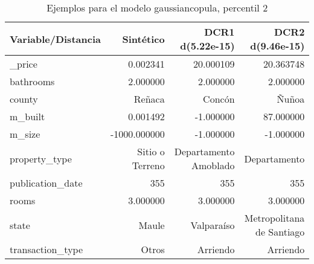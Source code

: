 \begin{table}[H]
\centering
\fontsize{10}{14}\selectfont
\caption{Ejemplos para el modelo gaussiancopula, percentil 2}
\label{table-example-economicos-b-1-gaussiancopula-2p}
\begin{tabular}{|l|r|r|r|}
\hline
\rowcolor[gray]{0.8}
Variable/Distancia & Sintético & DCR1 d(5.22e-15) & DCR2 d(9.46e-15) \\
\hline \_price & \cellcolor[rgb]{0.9, 0.54, 0.52} 0.002341 & 20.000109 & 20.363748 \\
\hline bathrooms & \cellcolor[rgb]{0.9, 0.54, 0.52} 2.000000 & \cellcolor[rgb]{0.9, 0.54, 0.52} 2.000000 & \cellcolor[rgb]{0.9, 0.54, 0.52} 2.000000 \\
\hline county & \cellcolor[rgb]{0.9, 0.54, 0.52} Reñaca & Concón & Ñuñoa \\
\hline m\_built & \cellcolor[rgb]{0.9, 0.54, 0.52} 0.001492 & \cellcolor[rgb]{0.9, 0.54, 0.52} -1.000000 & 87.000000 \\
\hline m\_size & \cellcolor[rgb]{0.9, 0.54, 0.52} -1000.000000 & \cellcolor[rgb]{0.9, 0.54, 0.52} -1.000000 & \cellcolor[rgb]{0.9, 0.54, 0.52} -1.000000 \\
\hline property\_type & \cellcolor[rgb]{0.9, 0.54, 0.52} Sitio o Terreno & Departamento Amoblado & Departamento \\
\hline publication\_date & \cellcolor[rgb]{0.9, 0.54, 0.52} 355 & \cellcolor[rgb]{0.9, 0.54, 0.52} 355 & \cellcolor[rgb]{0.9, 0.54, 0.52} 355 \\
\hline rooms & \cellcolor[rgb]{0.9, 0.54, 0.52} 3.000000 & \cellcolor[rgb]{0.9, 0.54, 0.52} 3.000000 & \cellcolor[rgb]{0.9, 0.54, 0.52} 3.000000 \\
\hline state & \cellcolor[rgb]{0.9, 0.54, 0.52} Maule & Valparaíso & Metropolitana de Santiago \\
\hline transaction\_type & \cellcolor[rgb]{0.9, 0.54, 0.52} Otros & Arriendo & Arriendo \\
\hline
\end{tabular}
\end{table}
